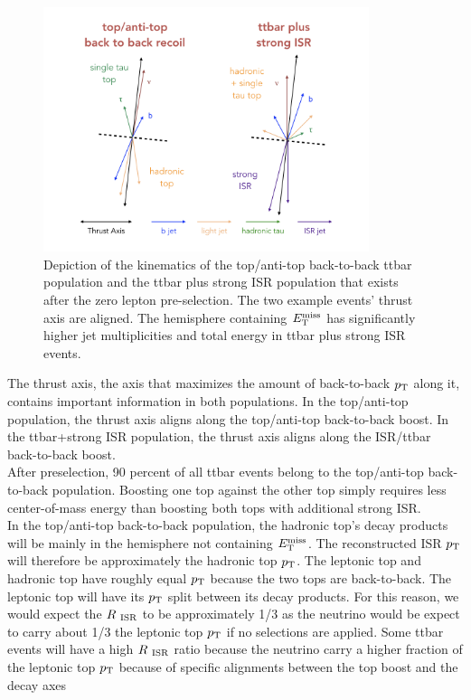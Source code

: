 \begin{figure}[h!]
  \centering
	\includegraphics[width=0.85\textwidth]{./figures/strategy/ttbar_2pop.png}
	\caption[Schematic depiction of the kinematics of the top/anti-top back-to-back ttbar population and the ttbar plus strong ISR population that exists after the zero lepton pre-selection.]{Depiction of the kinematics of the top/anti-top back-to-back ttbar population and the ttbar plus strong ISR population that exists after the zero lepton pre-selection. The two example events' thrust axis are aligned.  The hemisphere containing $E_{\mathrm{T}}^{\mathrm{miss}}$ has significantly higher jet multiplicities and total energy in ttbar plus strong ISR events. }
\label{fig:ttbar:2pop}
\end{figure}

\indent The thrust axis, the axis that maximizes the amount of back-to-back $p_{\mathrm{T}}$ along it, contains important information in both populations.  In the top/anti-top population, the thrust axis aligns along the top/anti-top back-to-back boost.  In the ttbar+strong ISR population, the thrust axis aligns along the ISR/ttbar back-to-back boost.  \\

\indent  After preselection, 90 percent of all ttbar events belong to the top/anti-top back-to-back population.  Boosting one top against the other top simply requires less center-of-mass energy than boosting both tops with additional strong ISR.  \\

\indent In the top/anti-top back-to-back population, the hadronic top's decay products will be mainly in the hemisphere not containing $E_{\mathrm{T}}^{\mathrm{miss}}$.  The reconstructed ISR $p_{\mathrm{T}}$ will therefore be approximately the hadronic top $p_{\mathrm{T}}$.  The leptonic top and hadronic top have roughly equal $p_{\mathrm{T}}$ because the two tops are back-to-back.  The leptonic top will have its $p_{\mathrm{T}}$ split between its decay products.  For this reason, we would expect the $R_{~\mathrm{ISR}}$ to be approximately 1/3 as the neutrino would be expect to carry about 1/3 the leptonic top $p_{\mathrm{T}}$ if no selections are applied. Some ttbar events will have a high $R_{~\mathrm{ISR}}$ ratio because the neutrino carry a higher fraction of the leptonic top $p_{\mathrm{T}}$ because of specific alignments between the top boost and the decay axes \\

